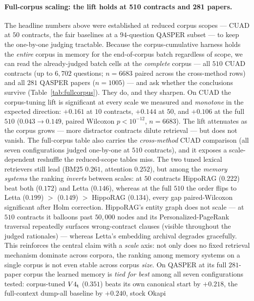\paragraph{Full-corpus scaling: the lift holds at 510 contracts and 281 papers.}
The headline numbers above were established at reduced corpus scopes --- CUAD at
$50$ contracts, the fair baselines at a $94$-question QASPER subset --- to keep
the one-by-one judging tractable. Because the corpus-cumulative harness holds the
\emph{entire} corpus in memory for the end-of-corpus batch regardless of scope, we
can read the already-judged batch cells at the \emph{complete} corpus --- all
$510$ CUAD contracts (up to $6{,}702$ questions; $n{=}6683$ paired across the
cross-method rows) and all $281$ QASPER papers ($n{=}1005$) --- and ask whether
the conclusions survive (Table~\ref{tab:fullcorpus}). They do, and they sharpen.
On CUAD the corpus-tuning lift is significant at every scale we measured and
\emph{monotone} in the expected direction: $+0.161$ at $10$ contracts, $+0.144$
at $50$, and $+0.106$ at the full $510$ ($0.043 \rightarrow 0.149$, paired
Wilcoxon $p<10^{-12}$, $n{=}6683$). The lift attenuates as the corpus grows --- more
distractor contracts dilute retrieval --- but does not vanish. The full-corpus
table also carries the \emph{cross-method} CUAD comparison (all seven
configurations judged one-by-one at $510$ contracts), and it exposes a
scale-dependent reshuffle the reduced-scope tables miss. The two tuned lexical
retrievers still lead (BM25 $0.261$, attention $0.252$), but among the
\emph{memory systems} the ranking \emph{inverts} between scales: at $50$ contracts
HippoRAG ($0.222$) beat both \Vt{} ($0.172$) and Letta ($0.146$), whereas at the
full $510$ the order flips to Letta ($0.199$) $>$ \Vt{} ($0.149$) $>$ HippoRAG
($0.134$), every gap paired-Wilcoxon significant after Holm correction. HippoRAG's
entity graph does not scale --- at $510$ contracts it balloons past $50{,}000$
nodes and its Personalized-PageRank traversal repeatedly surfaces wrong-contract
clauses (visible throughout the judged rationales) --- whereas Letta's embedding
archival degrades gracefully. This reinforces the central claim with a \emph{scale}
axis: not only does no fixed retrieval mechanism dominate across corpora, the
ranking among memory systems on a single corpus is not even stable across corpus
\emph{size}. On QASPER at its full
$281$-paper corpus the learned memory is \emph{tied for best} among all seven
configurations tested: corpus-tuned $V4\textsubscript{t}{}$ ($0.351$) beats its own canonical
start by $+0.218$, the full-context dump-all baseline by $+0.240$, stock Okapi
